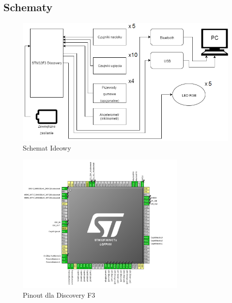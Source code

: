 \documentclass[12pt,a4paper]{article}
\begin{document}
\begin{enumerate}
\section{Schematy}
\begin{figure}[!htb]
\includegraphics[width=\textwidth]{./SchematIdeowy.png}
\caption{Schemat Ideowy}
\end{figure}
\begin{figure}[!htb]
\centering
\includegraphics[width=0.75\textwidth]{./pinout.png}
\caption{Pinout dla Discovery F3}
\end{figure}
\end{enumerate}
\end{document}
